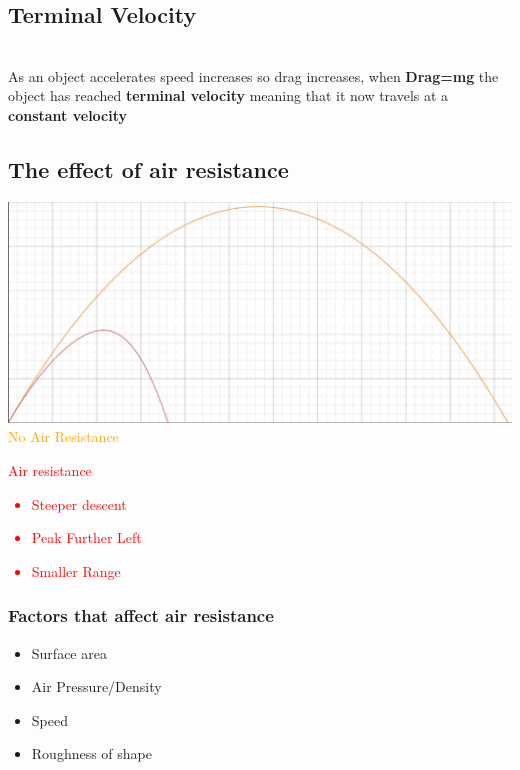 \documentclass{article}[18pt]
\begin{document}
\subsection{Terminal Velocity}

\\
As an object accelerates speed increases so drag increases, when \textbf{Drag=mg} the object has reached \textbf{terminal velocity} meaning that it now travels at a \textbf{constant velocity}
\subsection{The effect of air resistance}
\includegraphics[scale=0.25]{Air_Resistance.JPG}\\
\textcolor{orange}{No Air Resistance}\\
\textcolor{red}{Air resistance
\begin{itemize}
\item Steeper descent
\item Peak Further Left
\item Smaller Range
\end{itemize}}
\subsubsection{Factors that affect air resistance}
\begin{itemize}
\item Surface area
\item Air Pressure/Density
\item Speed
\item Roughness of shape
\end{itemize}
\end{document}
